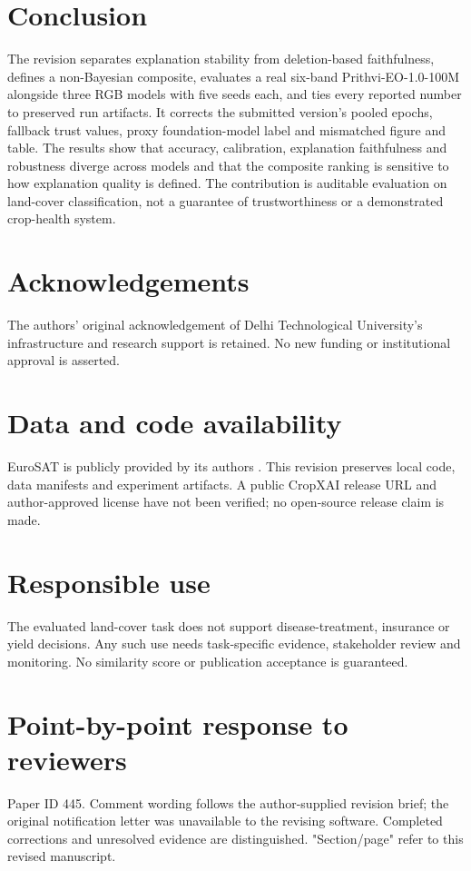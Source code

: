 \documentclass[3p,times,procedia]{elsarticle}
\begin{document}
\section{Conclusion}\label{sec:conclusion}
The revision separates explanation stability from deletion-based faithfulness, defines a non-Bayesian composite, evaluates a real six-band Prithvi-EO-1.0-100M alongside three RGB models with five seeds each, and ties every reported number to preserved run artifacts. It corrects the submitted version's pooled epochs, fallback trust values, proxy foundation-model label and mismatched figure and table. The results show that accuracy, calibration, explanation faithfulness and robustness diverge across models and that the composite ranking is sensitive to how explanation quality is defined. The contribution is auditable evaluation on land-cover classification, not a guarantee of trustworthiness or a demonstrated crop-health system.

\section*{Acknowledgements}
The authors' original acknowledgement of Delhi Technological University's infrastructure and research support is retained. No new funding or institutional approval is asserted.
\section*{Data and code availability}
EuroSAT is publicly provided by its authors \cite{eurosat}. This revision preserves local code, data manifests and experiment artifacts. A public CropXAI release URL and author-approved license have not been verified; no open-source release claim is made.
\section*{Responsible use}
The evaluated land-cover task does not support disease-treatment, insurance or yield decisions. Any such use needs task-specific evidence, stakeholder review and monitoring. No similarity score or publication acceptance is guaranteed.


\clearpage\section*{Point-by-point response to reviewers}

Paper ID 445. Comment wording follows the author-supplied revision brief; the original notification letter was unavailable to the revising software. Completed corrections and unresolved evidence are distinguished. "Section/page" refer to this revised manuscript.
\end{document}
